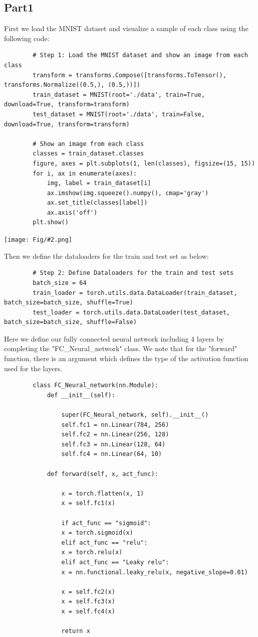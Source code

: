 \documentclass[]{article}
\newcommand{\pict}[2]{\begin{center}
		\texttt{[image: Fig/\#2.png]}
\end{center}}
\begin{document}
	\subsection{Part1}
	First we load the MNIST dataset and visualize a sample of each class using the following code:
	\begin{lstlisting}
		# Step 1: Load the MNIST dataset and show an image from each class
		transform = transforms.Compose([transforms.ToTensor(), transforms.Normalize((0.5,), (0.5,))])
		train_dataset = MNIST(root='./data', train=True, download=True, transform=transform)
		test_dataset = MNIST(root='./data', train=False, download=True, transform=transform)
		
		# Show an image from each class
		classes = train_dataset.classes
		figure, axes = plt.subplots(1, len(classes), figsize=(15, 15))
		for i, ax in enumerate(axes):
			img, label = train_dataset[i]
			ax.imshow(img.squeeze().numpy(), cmap='gray')
			ax.set_title(classes[label])
			ax.axis('off')
		plt.show()
	\end{lstlisting}
	\pict{1}{F6}
	Then we define the dataloaders for the train and test set as below:
	\begin{lstlisting}
		# Step 2: Define Dataloaders for the train and test sets
		batch_size = 64
		train_loader = torch.utils.data.DataLoader(train_dataset, batch_size=batch_size, shuffle=True)
		test_loader = torch.utils.data.DataLoader(test_dataset, batch_size=batch_size, shuffle=False)
	\end{lstlisting}
	Here we define our fully connected neural network including 4 layers by completing the "FC\_Neural\_network" class. We note that for the "forward" function, there is an argument which defines the type of the activation function used for the layers.
	\begin{lstlisting}
		class FC_Neural_network(nn.Module):
			def __init__(self):
			
				super(FC_Neural_network, self).__init__()
				self.fc1 = nn.Linear(784, 256)
				self.fc2 = nn.Linear(256, 128)
				self.fc3 = nn.Linear(128, 64)
				self.fc4 = nn.Linear(64, 10)
			
			def forward(self, x, act_func):
			
				x = torch.flatten(x, 1)
				x = self.fc1(x)
				
				if act_func == "sigmoid":
				x = torch.sigmoid(x)
				elif act_func == "relu":
				x = torch.relu(x)
				elif act_func == "Leaky relu":
				x = nn.functional.leaky_relu(x, negative_slope=0.01)
				
				x = self.fc2(x)
				x = self.fc3(x)
				x = self.fc4(x)
				
				return x
	\end{lstlisting}
\end{document}
